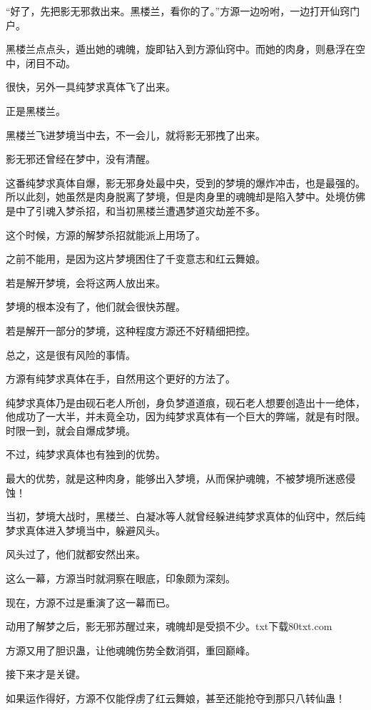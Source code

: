 
\begin{this_body}

“好了，先把影无邪救出来。黑楼兰，看你的了。”方源一边吩咐，一边打开仙窍门户。

黑楼兰点点头，遁出她的魂魄，旋即钻入到方源仙窍中。而她的肉身，则悬浮在空中，闭目不动。

很快，另外一具纯梦求真体飞了出来。

正是黑楼兰。

黑楼兰飞进梦境当中去，不一会儿，就将影无邪拽了出来。

影无邪还曾经在梦中，没有清醒。

这番纯梦求真体自爆，影无邪身处最中央，受到的梦境的爆炸冲击，也是最强的。所以此刻，她虽然是肉身脱离了梦境，但是肉身里的魂魄却是陷入梦中。处境仿佛是中了引魂入梦杀招，和当初黑楼兰遭遇梦道灾劫差不多。

这个时候，方源的解梦杀招就能派上用场了。

之前不能用，是因为这片梦境困住了千变意志和红云舞娘。

若是解开梦境，会将这两人放出来。

梦境的根本没有了，他们就会很快苏醒。

若是解开一部分的梦境，这种程度方源还不好精细把控。

总之，这是很有风险的事情。

方源有纯梦求真体在手，自然用这个更好的方法了。

纯梦求真体乃是由砚石老人所创，身负梦道道痕，砚石老人想要创造出十一绝体，他成功了一大半，并未竟全功，因为纯梦求真体有一个巨大的弊端，就是有时限。时限一到，就会自爆成梦境。

不过，纯梦求真体也有独到的优势。

最大的优势，就是这种肉身，能够出入梦境，从而保护魂魄，不被梦境所迷惑侵蚀！

当初，梦境大战时，黑楼兰、白凝冰等人就曾经躲进纯梦求真体的仙窍中，然后纯梦求真体进入梦境当中，躲避风头。

风头过了，他们就都安然出来。

这么一幕，方源当时就洞察在眼底，印象颇为深刻。

现在，方源不过是重演了这一幕而已。

动用了解梦之后，影无邪苏醒过来，魂魄却是受损不少。txt下载80txt.com

方源又用了胆识蛊，让他魂魄伤势全数消弭，重回巅峰。

接下来才是关键。

如果运作得好，方源不仅能俘虏了红云舞娘，甚至还能抢夺到那只八转仙蛊！


\end{this_body}
